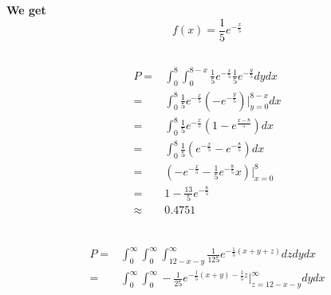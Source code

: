 \documentclass{article}
\begin{document}
    \section{}
        \paragraph{
            We get 
            $$f(x)=\frac{1}{5}e^{-\frac{x}{5}}$$
        }
        \subsection{}
            \paragraph{
                \begin{equation*}
                    \begin{split}
                        P=&\int_0^8\int_0^{8-x} \frac{1}{5}e^{-\frac{x}{5}}\frac{1}{5}e^{-\frac{y}{5}} dydx\\
                            =&\int_0^8\frac{1}{5}e^{-\frac{x}{5}}(-e^{-\frac{y}{5}})|_{y=0}^{8-x}dx\\
                            =&\int _0^8 \frac{1}{5}e^{-\frac{x}{5}}(1-e^{\frac{x-8}{5}})dx\\
                            =&\int_0^8\frac{1}{5}(e^{-\frac{x}{5}}-e^{-\frac{8}{5}})dx\\
                            =&(-e^{-\frac{x}{5}}-\frac{1}{5}e^{-\frac{8}{5}}x)|_{x=0}^8\\
                            =& 1-\frac{13}{5}e^{-\frac{8}{5}}\\
                            \approx&0.4751\\
                    \end{split}
                \end{equation*}
            }
        \subsection{}
            \paragraph{
                \begin{equation*}
                    \begin{split}
                        P=&\int _0^\infty \int _0 ^\infty \int_{12-x-y} ^\infty \frac{1}{125}e^{-\frac{1}{5}(x+y+z)}dzdydx\\
                            =&\int _0^\infty \int _0 ^\infty -\frac{1}{25}e^{-\frac{1}{5}(x+y)-\frac{1}{5}z}|_{z=12-x-y}^\infty dydx
                    \end{split}
                \end{equation*}
            }
\end{document}
